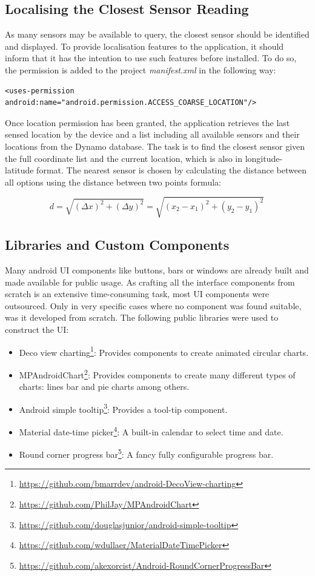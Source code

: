 \subsection{Localising the Closest Sensor Reading}
As many sensors may be available to query, the closest sensor should be identified and displayed. To provide localisation features to the application, it should inform that it has the intention to use such features before installed. To do so, the permission is added to the project \textit{manifest.xml} in the following way: \bigskip

{\centering
\begin{BVerbatim}
<uses-permission android:name="android.permission.ACCESS_COARSE_LOCATION"/>
\end{BVerbatim}
\par
}
\bigskip

Once location permission has been granted, the application retrieves the last sensed location by the device and a list including all available sensors and their locations from the Dynamo database. The task is to find the closest sensor given the full coordinate list and the current location, which is also in longitude-latitude format. The nearest sensor is chosen by calculating the distance between all options using the distance between two points formula: 

\begin{equation}
d={\sqrt {(\Delta x)^{2}+(\Delta y)^{2}}}={\sqrt {(x_{2}-x_{1})^{2}+(y_{2}-y_{1})^{2}}}\,
\end{equation}

\subsection{Libraries and Custom Components}
Many android UI components like buttons, bars or windows are already built and made available for public usage. As crafting all the interface components from scratch is an extensive time-consuming task, most UI components were outsourced. Only in very specific cases where no component was found suitable, was it developed from scratch. 
The following public libraries were used to construct the UI:
\begin{itemize}
    \item Deco view charting\footnote{\url{https://github.com/bmarrdev/android-DecoView-charting}}: Provides components to create animated circular charts.
    \item MPAndroidChart\footnote{\url{https://github.com/PhilJay/MPAndroidChart}}: Provides components to create many different types of charts: lines bar and pie charts among others.
    \item Android simple tooltip\footnote{\url{https://github.com/douglasjunior/android-simple-tooltip}}: Provides a tool-tip component.
	\item Material date-time picker\footnote{\url{https://github.com/wdullaer/MaterialDateTimePicker}}: A built-in calendar to select time and date.
  \item Round corner progress bar\footnote{\url{https://github.com/akexorcist/Android-RoundCornerProgressBar}}: A fancy fully configurable progress bar.
\end{itemize}

